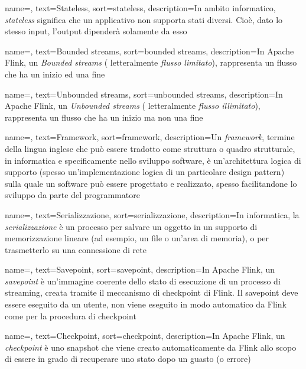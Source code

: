 {
    name=,
    text=Stateless,
    sort=stateless,
    description={In ambito informatico, \emph{stateless} significa che un applicativo non supporta stati diversi. Cioè, dato lo stesso input, l'output dipenderà solamente da esso}
}

{
    name=,
    text=Bounded streams,
    sort=bounded streams,
    description={In Apache Flink, un \textit{Bounded streams} ( letteralmente \textit{flusso limitato}), rappresenta un flusso che ha un inizio ed una fine}
}

{
    name=,
    text=Unbounded streams,
    sort=unbounded streams,
    description={In Apache Flink, un \textit{Unbounded streams} ( letteralmente \textit{flusso illimitato}), rappresenta un flusso che ha un inizio ma non una fine}
}

{
    name=,
    text=Framework,
    sort=framework,
    description={Un \textit{framework}, termine della lingua inglese che può essere tradotto come struttura o quadro strutturale, in informatica e specificamente nello sviluppo software, è un'architettura logica di supporto (spesso un'implementazione logica di un particolare design pattern) sulla quale un software può essere progettato e realizzato, spesso facilitandone lo sviluppo da parte del programmatore}
}


{
    name=,
    text=Serializzazione,
    sort=serializzazione,
    description={In informatica, la \textit{serializzazione} è un processo per salvare un oggetto in un supporto di memorizzazione lineare (ad esempio, un file o un'area di memoria), o per trasmetterlo su una connessione di rete}
}

{
    name=,
    text=Savepoint,
    sort=savepoint,
    description={In Apache Flink, un \textit{savepoint} è un'immagine coerente dello stato di esecuzione di un processo di streaming, creata tramite il meccanismo di \gls{checkpoint} di Flink. Il savepoint deve essere eseguito da un utente, non viene eseguito in modo automatico da Flink come per la procedura di \gls{checkpoint}}
}


{
    name=,
    text=Checkpoint,
    sort=checkpoint,
    description={In Apache Flink, un \textit{checkpoint} è uno snapshot che viene creato automaticamente da Flink allo scopo di essere in grado di recuperare uno stato dopo un guasto (o errore)}
}

